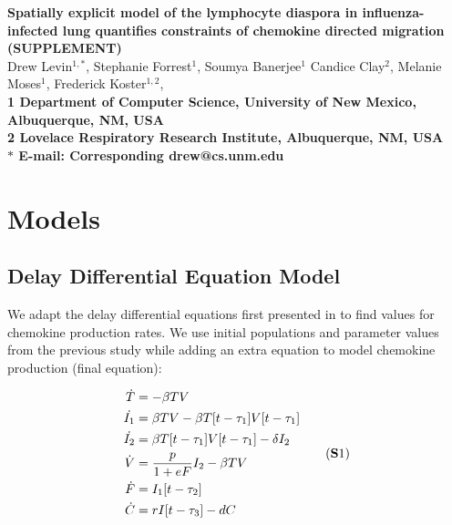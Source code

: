 \documentclass[10pt]{article}
\date{}
\begin{document}
\begin{flushleft}
{\Large
\textbf{Spatially explicit model of the lymphocyte diaspora in influenza-infected lung quantifies constraints of chemokine directed migration (SUPPLEMENT)}
}
\\
Drew Levin$^{1,\ast}$, 
Stephanie Forrest$^{1}$, 
Soumya Banerjee$^{1}$
Candice Clay$^{2}$, 
Melanie Moses$^{1}$, 
Frederick Koster$^{1,2}$, 
\\
\bf{1} Department of Computer Science, University of New Mexico, Albuquerque, NM, USA
\\
\bf{2} Lovelace Respiratory Research Institute, Albuquerque, NM, USA
\\
$\ast$ E-mail: Corresponding drew@cs.unm.edu
\end{flushleft}


\section{Models}

\subsection{Delay Differential Equation Model}

We adapt the delay differential equations first presented in \cite{Mitchell2011} to find values for chemokine production rates.  We use initial populations and parameter values from the previous study while adding an extra equation to model chemokine production (final equation):

\begin{equation*}
\label{EqS1}
\begin{aligned}
\dot{T} &= - \beta T V \\
\dot{I_1} &= \beta T V - \beta T[t-\tau_1]V[t-\tau_1] \\
\dot{I_2} &= \beta T[t-\tau_1]V[t-\tau_1] - \delta I_2 \\
\dot{V} &= \frac{p}{1+eF} I_2  - \beta T V  \\
\dot{F} &=  I_1[t-\tau_2] \\
\dot{C} &= r I[t-\tau_3] - d C \\
\end{aligned}
\tag{\textbf{S}1}
\end{equation*}
\vspace{.05in}
\end{document}
